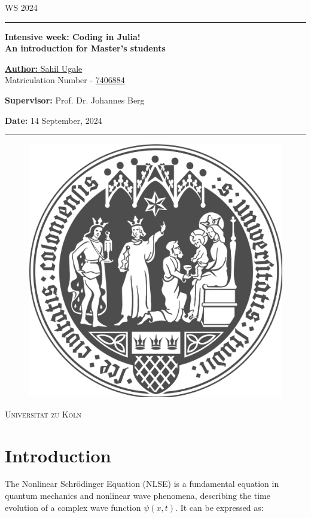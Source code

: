 \documentclass[8pt, a4paper, twocolumn]{article}
\begin{document}
\begin{titlepage}
	WS 2024
	\vspace{1cm}
	\begin{center}
		\rule{\textwidth}{0.4pt}

		\vspace{1cm}
		\textbf{\Huge Intensive week: Coding in Julia!\\[1ex]
		    \Large{An introduction for Master's students}}
		    
		\vspace{1cm}
		{\Large\underline{\textbf{Author:} Sahil Ugale}}\\
		\vspace{0.2cm}
		Matriculation Number - \underline{7406884}
		
		\vspace{1cm}
		{\large{
		\textbf{Supervisor:} Prof. Dr. Johannes Berg
		
		\vspace{1cm}
		
		\textbf{Date:} 14 September, 2024}}
        \vspace{1cm}
		\rule{\textwidth}{0.4pt}
        \begin{figure}[hb]
		    \centering
		    \includegraphics[width=0.4\linewidth]{images/uni_koeln.png}
		\end{figure}
		\Huge{\textsc{Universität zu Köln}}

	\end{center}
\end{titlepage}

\tableofcontents
\hrulefill

\section{Introduction}

The Nonlinear Schrödinger Equation (NLSE) is a fundamental equation in quantum mechanics and nonlinear wave 
phenomena, describing the time evolution of a complex wave function $\psi(x,t)$. It can be expressed as:
\end{document}
